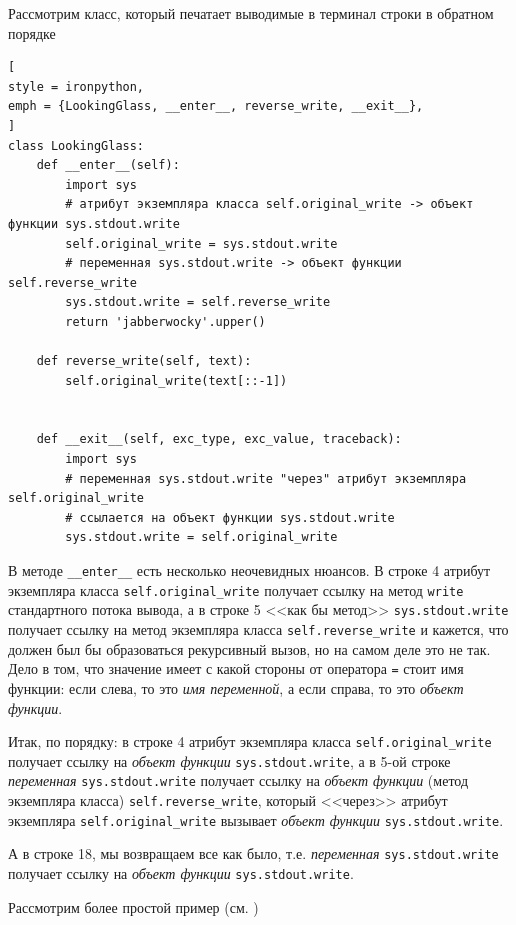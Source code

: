 \documentclass[%
	11pt,
	a4paper,
	utf8,
		]{article}
\begin{document}
Рассмотрим класс, который печатает выводимые в терминал строки в обратном порядке

\begin{lstlisting}[
style = ironpython,
emph = {LookingGlass, __enter__, reverse_write, __exit__},
]
class LookingGlass:
    def __enter__(self):
        import sys
        # атрибут экземпляра класса self.original_write -> объект функции sys.stdout.write
        self.original_write = sys.stdout.write  
        # переменная sys.stdout.write -> объект функции self.reverse_write
        sys.stdout.write = self.reverse_write  
        return 'jabberwocky'.upper()
        
    def reverse_write(self, text):
        self.original_write(text[::-1])
        
        
    def __exit__(self, exc_type, exc_value, traceback):
        import sys
        # переменная sys.stdout.write "через" атрибут экземпляра self.original_write 
        # ссылается на объект функции sys.stdout.write
        sys.stdout.write = self.original_write
\end{lstlisting}

В методе \texttt{\_\_enter\_\_} есть несколько неочевидных нюансов. В строке 4 атрибут экземпляра класса \texttt{self.original\_write} получает ссылку на метод \texttt{write} стандартного потока вывода, а в строке 5 <<как бы метод>> \texttt{sys.stdout.write} получает ссылку на метод экземпляра класса \texttt{self.reverse\_write} и кажется, что должен был бы образоваться рекурсивный вызов, но на самом деле это не так. Дело в том, что значение имеет с какой стороны от оператора \texttt{=} стоит имя функции: если слева, то это \emph{имя переменной}, а если справа, то это \emph{объект функции}.

Итак, по порядку: в строке 4 атрибут экземпляра класса \texttt{self.original\_write} получает ссылку на \emph{объект функции} \texttt{sys.stdout.write}, а в 5-ой строке \emph{переменная} \texttt{sys.stdout.write} получает ссылку на \emph{объект функции} (метод экземпляра класса) \texttt{self.reverse\_write}, который <<через>> атрибут экземпляра \texttt{self.original\_write} вызывает \emph{объект функции} \texttt{sys.stdout.write}.

А в строке 18, мы возвращаем все как было, т.е. \emph{переменная} \texttt{sys.stdout.write} получает ссылку на \emph{объект функции} \texttt{sys.stdout.write}.

Рассмотрим более простой пример (см. )
\end{document}
